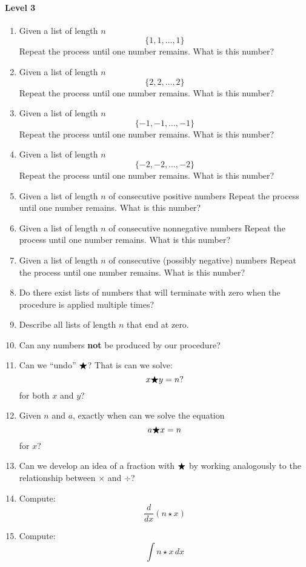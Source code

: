 \documentclass[nooutcomes]{ximera}
\begin{document}
\begin{problem}
\begin{freeResponse}
  \paragraph{Level 3}
  \begin{enumerate}
  \item Given a list of length $n$
    \[
    \{1,1, \dots, 1\}
    \]
    Repeat the process until one number remains. What is this number?
  \item Given a list of length $n$
    \[
    \{2,2, \dots, 2\}
    \]
    Repeat the process until one number remains. What is this number?
  \item Given a list of length $n$
    \[
    \{-1,-1, \dots, -1\}
    \]
    Repeat the process until one number remains. What is this number?
  \item Given a list of length $n$
    \[
    \{-2,-2, \dots, -2\}
    \]
    Repeat the process until one number remains. What is this number?
  \item Given a list of length $n$ of consecutive positive numbers
    Repeat the process until one number remains. What is this number?
  \item Given a list of length $n$ of consecutive nonnegative numbers
    Repeat the process until one number remains. What is this number?
  \item Given a list of length $n$ of consecutive (possibly negative)
    numbers Repeat the process until one number remains. What is this
    number?
  \item Do there exist lists of numbers that will terminate with zero
    when the procedure is applied multiple times?
  \item Describe all lists of length $n$ that end at zero.
  \item Can any numbers \textbf{not} be produced by our procedure?
  \item Can we ``undo'' $\bigstar$? That is can we solve:
    \[
    x \bigstar y = n?
    \]
    for both $x$ and $y$?
  \item Given $n$ and $a$, exactly when can we solve the equation
      \[
      a\bigstar x = n
      \]
      for $x$?
      \item Can we develop an idea of a fraction with $\bigstar$ by working
        analogously to the relationship between $\times$ and $\div$?
  \item Compute:
    \[
    \frac{d}{dx} (n\star x)
    \]
  \item Compute:
    \[
    \int n\star x \,d x
    \]
  \end{enumerate}
\end{freeResponse}
\end{problem}
\end{document}

